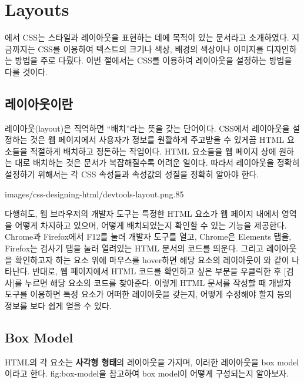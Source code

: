 \section{Layouts} \label{sect:layouts}

에서 CSS는 스타일과 레이아웃을 표현하는 데에 목적이 있는 문서라고 소개하였다. 지금까지는 CSS를 이용하여 텍스트의 크기나 색상, 배경의 색상이나 이미지를 디자인하는 방법을 주로 다뤘다. 이번 절에서는 CSS를 이용하여 레이아웃을 설정하는 방법을 다룰 것이다.

\subsection*{레이아웃이란}
레이아웃(layout)은 직역하면 ``배치''라는 뜻을 갖는 단어이다. CSS에서 레이아웃을 설정하는 것은 웹 페이지에서 사용자가 정보를 원활하게 주고받을 수 있게끔 HTML 요소들을 적절하게 배치하고 정돈하는 작업이다. HTML 요소들을 웹 페이지 상에 원하는 대로 배치하는 것은 문서가 복잡해질수록 어려운 일이다. 따라서 레이아웃을 정확히 설정하기 위해서는 각 CSS 속성들과 속성값의 성질을 정확히 알아야 한다.

    {images/css-designing-html/devtools-layout.png}{.85}

다행히도, 웹 브라우저의 개발자 도구는 특정한 HTML 요소가 웹 페이지 내에서 영역을 어떻게 차지하고 있으며, 어떻게 배치되었는지 확인할 수 있는 기능을 제공한다. Chrome과 Firefox에서 F12를 눌러 개발자 도구를 열고, Chrome은 Elements 탭을, Firefox는 검사기 탭을 눌러 열려있는 HTML 문서의 코드를 띄운다. 그리고 레이아웃을 확인하고자 하는 요소 위에 마우스를 hover하면 해당 요소의 레이아웃이 와 같이 나타난다. 반대로, 웹 페이지에서 HTML 코드를 확인하고 싶은 부분을 우클릭한 후 [검사]를 누르면 해당 요소의 코드를 찾아준다. 이렇게 HTML 문서를 작성할 때 개발자 도구를 이용하면 특정 요소가 어떠한 레이아웃을 갖는지, 어떻게 수정해야 할지 등의 정보를 보다 쉽게 얻을 수 있다.

\subsection*{Box Model}
HTML의 각 요소는 \textbf{사각형 형태}의 레이아웃을 가지며, 이러한 레이아웃을 box model이라고 한다. {fig:box-model}을 참고하여 box model이 어떻게 구성되는지 알아보자.

